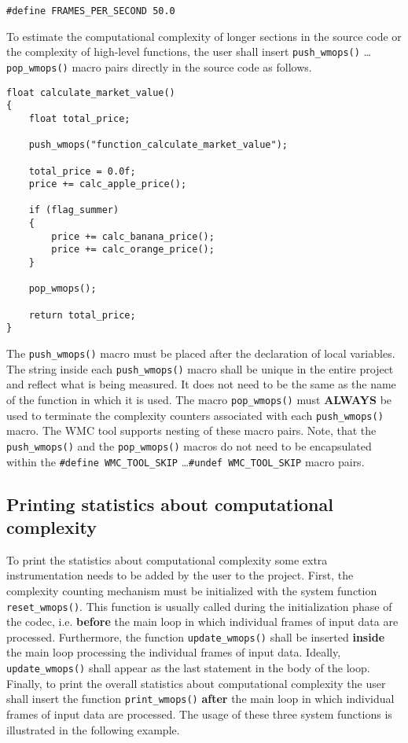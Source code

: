 \begin{Verbatim}[fontsize=\small]
#define FRAMES_PER_SECOND 50.0
\end{Verbatim}

To estimate the computational complexity of longer sections in the source code or the complexity of high-level functions, the user shall insert \verb|push_wmops()| \ldots \verb|pop_wmops()| macro pairs directly in the source code as follows.

\begin{Verbatim}[fontsize=\small]
float calculate_market_value()
{
    float total_price;

    push_wmops("function_calculate_market_value");

    total_price = 0.0f;
    price += calc_apple_price();

    if (flag_summer)
    {
        price += calc_banana_price();
        price += calc_orange_price();
    }

    pop_wmops();

    return total_price;
}
\end{Verbatim}

The \verb|push_wmops()| macro must be placed after the declaration of local variables. The string inside each \verb|push_wmops()| macro shall be unique in the entire project and reflect what is being measured. It does not need to be the same as the name of the function in which it is used. The macro \verb|pop_wmops()| must \textbf{ALWAYS} be used to terminate the complexity counters associated with each \verb|push_wmops()| macro. The WMC tool supports nesting of these macro pairs. Note, that the \verb|push_wmops()| and the \verb|pop_wmops()| macros do not need to be encapsulated within the \verb|#define WMC_TOOL_SKIP| \ldots \verb|#undef WMC_TOOL_SKIP| macro pairs.

\subsection{Printing statistics about computational complexity}
\label{ch:printing_statistics_about_computational_complexity}

To print the statistics about computational complexity some extra instrumentation needs to be added by the user to the project. First, the complexity counting mechanism must be initialized with the system function \verb|reset_wmops()|. This function is usually called during the initialization phase of the codec, i.e. \textbf{before} the main loop in which individual frames of input data are processed. Furthermore, the function \verb|update_wmops()| shall be inserted \textbf{inside} the main loop processing the individual frames of input data. Ideally, \verb|update_wmops()| shall appear as the last statement in the body of the loop. Finally, to print the overall statistics about computational complexity the user shall insert the function \verb|print_wmops()| \textbf{after} the main loop in which individual frames of input data are processed. The usage of these three system functions is illustrated in the following example.

